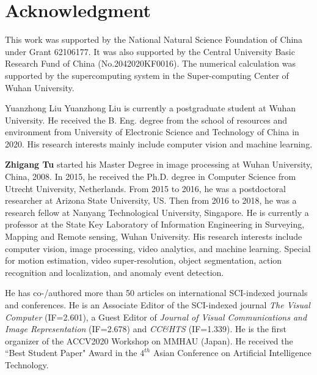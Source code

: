 \documentclass[journal]{IEEEtran}
\begin{document}
\section*{Acknowledgment}
This work was supported by the National Natural Science Foundation of China under Grant 62106177. It was also supported by the Central University Basic Research Fund of China (No.2042020KF0016). The numerical calculation was supported by the supercomputing system in the Super-computing Center of Wuhan University.

\ifCLASSOPTIONcaptionsoff
  \newpage
\fi




\begin{IEEEbiography}{Yuanzhong Liu}
Yuanzhong Liu is currently a postgraduate student at Wuhan University. He received the B. Eng. degree from the school of resources and environment from University of Electronic Science and Technology of China in 2020. His research interests mainly include computer vision and machine learning.
\end{IEEEbiography}

\vspace{-1.0cm}

\begin{IEEEbiography}
{\textbf{Zhigang Tu}} started his Master Degree in image processing at Wuhan University, China, 2008. In 2015, he received the Ph.D. degree in Computer Science from Utrecht University, Netherlands. From 2015 to 2016, he was a postdoctoral researcher at Arizona State University, US. Then from 2016 to 2018, he was a research fellow at Nanyang Technological University, Singapore. He is currently a professor at the State Key Laboratory of Information Engineering in Surveying, Mapping and Remote sensing, Wuhan University. His research interests include computer vision, image processing, video analytics, and machine learning. Special for motion estimation, video super-resolution, object segmentation, action recognition and localization, and anomaly event detection. 

He has co-/authored more than 50 articles on international SCI-indexed journals and conferences. He is an Associate Editor of the SCI-indexed journal \textit{The Visual Computer} (IF=2.601), a Guest Editor of \textit{Journal of Visual Communications and Image Representation} (IF=2.678) and \textit{CC\&HTS} (IF=1.339). He is the first organizer of the ACCV2020 Workshop on MMHAU (Japan). He received the ``Best Student Paper" Award in the $4^{th}$ Asian Conference on Artificial Intelligence Technology.
\end{IEEEbiography}
\end{document}
